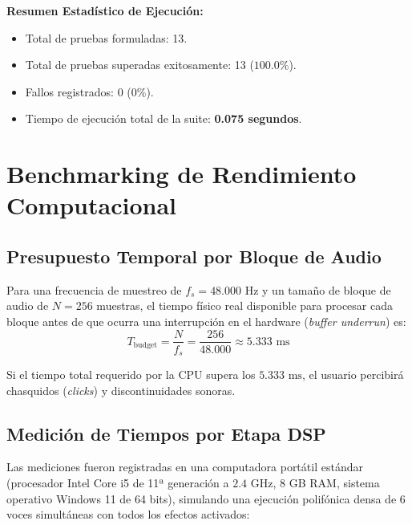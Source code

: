 \documentclass[11pt,a4paper]{article}
\begin{document}
\textbf{Resumen Estadístico de Ejecución:}
\begin{itemize}[leftmargin=1.5cm]
    \item Total de pruebas formuladas: 13.
    \item Total de pruebas superadas exitosamente: 13 ($100.0\%$).
    \item Fallos registrados: 0 ($0\%$).
    \item Tiempo de ejecución total de la suite: \textbf{0.075 segundos}.
\end{itemize}

\section{Benchmarking de Rendimiento Computacional}

\subsection{Presupuesto Temporal por Bloque de Audio}
Para una frecuencia de muestreo de $f_s = 48.000\text{ Hz}$ y un tamaño de bloque de audio de $N = 256$ muestras, el tiempo físico real disponible para procesar cada bloque antes de que ocurra una interrupción en el hardware (\textit{buffer underrun}) es:
\begin{equation}
T_{\text{budget}} = \frac{N}{f_s} = \frac{256}{48.000} \approx 5.333\text{ ms}
\end{equation}

Si el tiempo total requerido por la CPU supera los $5.333\text{ ms}$, el usuario percibirá chasquidos (\textit{clicks}) y discontinuidades sonoras.

\subsection{Medición de Tiempos por Etapa DSP}
Las mediciones fueron registradas en una computadora portátil estándar (procesador Intel Core i5 de 11ª generación a $2.4\text{ GHz}$, 8 GB RAM, sistema operativo Windows 11 de 64 bits), simulando una ejecución polifónica densa de 6 voces simultáneas con todos los efectos activados:
\end{document}
